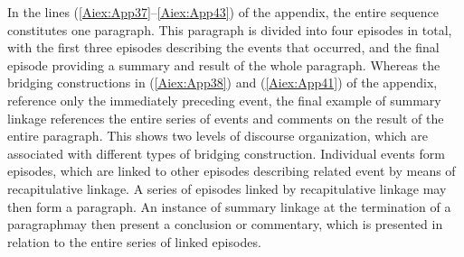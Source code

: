 \documentclass[output=paper]{LSP/langsci}
\begin{document}
	In the lines (\ref{Aiex:App37}--\ref{Aiex:App43}) of the appendix, the entire sequence constitutes one paragraph. This paragraph is divided into four episodes in total, with the first three episodes describing the events that occurred, and the final episode providing a summary and result of the whole paragraph. Whereas the bridging constructions in (\ref{Aiex:App38}) and (\ref{Aiex:App41}) of the appendix, reference only the immediately preceding event, the final example of summary linkage references the entire series of events and comments on the result of the entire paragraph. This shows two levels of discourse organization, which are associated with different types of bridging construction. Individual events form episodes, which are linked to other episodes describing related event by means of recapitulative linkage. A series of episodes linked by recapitulative linkage may then form a paragraph. An instance of summary linkage at the termination of a paragraphmay then present a conclusion or commentary, which is presented in relation to the entire series of linked episodes.
	
\end{document}

